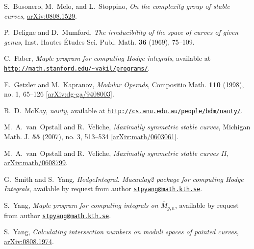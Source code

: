 \documentclass{amsart}
\newcommand{\arXiv}[1]{\href{http://arxiv.org/abs/#1}{arXiv:#1}}
\theoremstyle{plain}
\theoremstyle{definition}
\begin{document}
\begin{thebibliography}{2}

  S.~Busonero, M.~Melo, and L.~Stoppino,
  \emph{On the complexity group of stable curves},
  \arXiv{0808.1529}.%

  P.~Deligne and D.~Mumford,
  \emph{The irreducibility of the space of curves of given genus},
  Inst. Hautes \'Etudes Sci. Publ. Math. \textbf{36} (1969), 75--109.

  C.~Faber,
  \emph{Maple program for computing Hodge integrals},
  available at \href{http://math.stanford.edu/~vakil/programs/}
  {\texttt{http://math.stanford.edu/\~{}vakil/programs/}}.

  E.~Getzler and M.~Kapranov,
  \emph{Modular Operads},
  Compositio Math. \textbf{110} (1998), no. 1, 65--126
  [\arXiv{dg-ga/9408003}].

  B.~D.~McKay,
  \emph{nauty},
  available at \href{http://cs.anu.edu.au/people/bdm/nauty/}
  {\texttt{http://cs.anu.edu.au/people/bdm/nauty/}}.

  M.~A.~van~Opstall and R.~Veliche,
  \emph{Maximally symmetric stable curves},
  Michigan Math. J. \textbf{55} (2007), no. 3, 513--534
  [\arXiv{math/0603061}].

  M.~A.~van~Opstall and R.~Veliche,
  \emph{Maximally symmetric stable curves II},
  \arXiv{math/0608799}.%

  G.~Smith and S.~Yang,
  \emph{HodgeIntegral. Macaulay2 package for computing Hodge Integrals},
  available by request from author \href{mailto:stpyang@math.kth.se}
  {\texttt{stpyang@math.kth.se}}.

  S.~Yang,
  \emph{Maple program for computing integrals on $\overline{M}_{g,n}$},
  available by request from author \href{mailto:stpyang@math.kth.se}
  {\texttt{stpyang@math.kth.se}}.

  S.~Yang,
  \emph{Calculating intersection numbers on moduli spaces of pointed curves},
  \arXiv{0808.1974}.%

\end{thebibliography}
\end{document}
